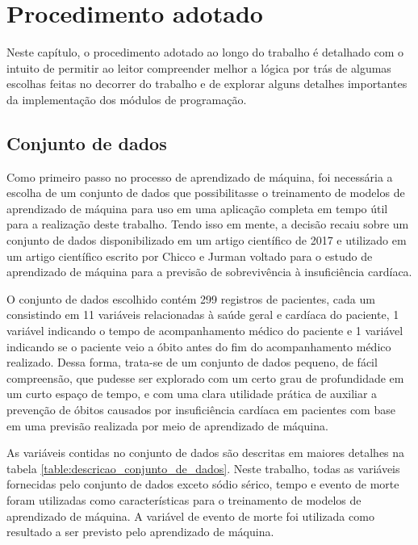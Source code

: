 \chapter{Procedimento adotado} \label{chap:procedimento_adotado}

Neste capítulo, o procedimento adotado ao longo do trabalho é detalhado com o intuito de permitir ao leitor compreender melhor a lógica por trás de algumas escolhas feitas no decorrer do trabalho e de explorar alguns detalhes importantes da implementação dos módulos de programação.

\section{Conjunto de dados}

Como primeiro passo no processo de aprendizado de máquina, foi necessária a escolha de um conjunto de dados que possibilitasse o treinamento de modelos de aprendizado de máquina para uso em uma aplicação completa em tempo útil para a realização deste trabalho. Tendo isso em mente, a decisão recaiu sobre um conjunto de dados \cite{larxel_dataset} disponibilizado em um artigo científico de 2017 \cite{dataset_article} e utilizado em um artigo científico escrito por Chicco e Jurman \cite{chicco2020} voltado para o estudo de aprendizado de máquina para a previsão de sobrevivência à insuficiência cardíaca.

O conjunto de dados escolhido contém 299 registros de pacientes, cada um consistindo em 11 variáveis relacionadas à saúde geral e cardíaca do paciente, 1 variável indicando o tempo de acompanhamento médico do paciente e 1 variável indicando se o paciente veio a óbito antes do fim do acompanhamento médico realizado. Dessa forma, trata-se de um conjunto de dados pequeno, de fácil compreensão, que pudesse ser explorado com um certo grau de profundidade em um curto espaço de tempo, e com uma clara utilidade prática de auxiliar a prevenção de óbitos causados por insuficiência cardíaca em pacientes com base em uma previsão realizada por meio de aprendizado de máquina.

As variáveis contidas no conjunto de dados são descritas em maiores detalhes na tabela \ref{table:descricao_conjunto_de_dados}. Neste trabalho, todas as variáveis fornecidas pelo conjunto de dados exceto sódio sérico, tempo e evento de morte foram utilizadas como características para o treinamento de modelos de aprendizado de máquina. A variável de evento de morte foi utilizada como resultado a ser previsto pelo aprendizado de máquina.

